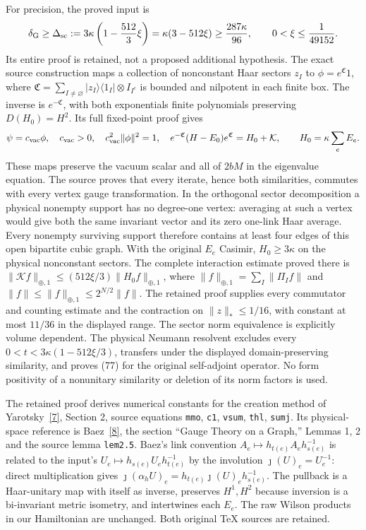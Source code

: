 \documentclass[11pt]{article}
\begin{document}
For precision, the proved input is
\begin{equation}\label{eq:stronggap}
 \delta_{\rm G}\geq\Delta_{\rm sc}
 :=3\kappa\left(1-\frac{512}{3}\xi\right)
 =\kappa(3-512\xi)\geq\frac{287\kappa}{96},
 \qquad 0<\xi\leq\frac1{49152}.
\end{equation}
Its entire proof is retained, not a proposed additional hypothesis.
The exact source construction maps a collection of nonconstant
Haar sectors $z_I$ to $\phi=e^{\mathfrak C}1$, where
$\mathfrak C=\sum_{I\ne\varnothing}|z_I\rangle\langle1_I|
\otimes I_{I^c}$ is bounded and nilpotent in each finite box.
The inverse is $e^{-\mathfrak C}$, with both exponentials finite
polynomials preserving $D(H_0)=H^2$. Its full fixed-point proof gives
\[
 \psi=c_{\rm vac}\phi,\quad
 c_{\rm vac}>0,\quad c_{\rm vac}^2\|\phi\|^2=1,\quad
 e^{-\mathfrak C}(H-E_0)e^{\mathfrak C}=H_0+\mathcal K,
 \qquad H_0=\kappa\sum_eE_e.
\]
These maps preserve the vacuum scalar and all of $2bM$ in the
eigenvalue equation. The source proves that every iterate, hence both
similarities, commutes with every vertex gauge transformation.
In the orthogonal sector decomposition a physical nonempty support
has no degree-one vertex: averaging at such a vertex would give both
the same invariant vector and its zero one-link Haar average.
Every nonempty surviving support therefore contains at least four
edges of this open bipartite cubic graph. With the original
$E_e$ Casimir, $H_0\geq3\kappa$ on the physical nonconstant sectors.
The complete interaction estimate proved there is
$\|\mathcal K f\|_{\oplus,1}\leq(512\xi/3)\|H_0f\|_{\oplus,1}$,
where $\|f\|_{\oplus,1}=\sum_I\|\Pi_If\|$ and
$\|f\|\leq\|f\|_{\oplus,1}\leq2^{N/2}\|f\|$.
The retained proof supplies every commutator and counting estimate
and the contraction on $\|z\|_*\leq1/16$, with constant at most
$11/36$ in the displayed range. The sector norm equivalence is
explicitly volume dependent. The physical Neumann resolvent excludes
every $0<t<3\kappa(1-512\xi/3)$, transfers under the displayed
domain-preserving similarity, and proves (77) for the
original self-adjoint operator. No form positivity of a nonunitary
similarity or deletion of its norm factors is used.

The retained proof derives numerical constants for the creation method
of Yarotsky~\href{https://arxiv.org/abs/math-ph/0411042v1}{[7]}, Section 2, source equations
\texttt{mmo}, \texttt{c1}, \texttt{vsum}, \texttt{thl},
\texttt{sumj}. Its physical-space reference is Baez~\href{https://arxiv.org/abs/gr-qc/9411007v1}{[8]},
the section ``Gauge Theory on a Graph,'' Lemmas 1, 2 and the source
lemma \texttt{lem2.5}. Baez's link convention
$A_e\mapsto h_{t(e)}A_eh_{s(e)}^{-1}$ is related to the input's
$U_e\mapsto h_{s(e)}U_eh_{t(e)}^{-1}$ by the involution
$\jmath(U)_e=U_e^{-1}$: direct multiplication gives
$\jmath(\alpha_hU)_e=h_{t(e)}\jmath(U)_eh_{s(e)}^{-1}$.
The pullback is a Haar-unitary map with itself as inverse,
preserves $H^1,H^2$ because inversion is a bi-invariant metric
isometry, and intertwines each $E_e$. The raw Wilson products in
our Hamiltonian are unchanged. Both original TeX sources are retained.
\end{document}
